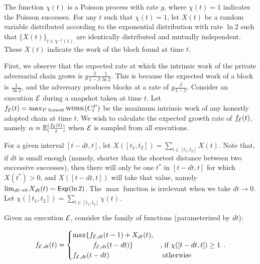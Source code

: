 The function $\chi(t)$ is a Poisson process with rate $g$, where $\chi(t) = 1$
indicates the Poisson successes. For any $t$ such that $\chi(t) = 1$, let $X(t)$ be a
random variable distributed according to the exponential distribution with rate $\ln2$
such that $\{ X(t) \}_{t \in \chi^{-1}(1)}$ are identically distributed and mutually
independent. These $X(t)$ indicate the work of the block found at time $t$.

First, we observe that the expected rate at which the intrinsic work of the private adversarial
chain grows is $g \frac{\beta}{1 - \beta} \frac{1}{\ln2}$. This is because the expected work of a
block is $\frac{1}{\ln2}$, and the adversary produces blocks at a rate of $g \frac{\beta}{1 - \beta}$.
Consider an execution $\mathcal{E}$ during a snapshot taken at time $t$. Let
$f_{\mathcal{E}}(t) = \max_{P \text{ honest}}{\textsc{work}(C^P_t)}$ be the maximum intrinsic work of any honestly
adopted chain at time $t$. We wish to calculate the expected growth rate of $f_{\mathcal{E}}(t)$, namely
$\alpha = \mathop{{}\mathbb{E}}[\frac{f_{\mathcal{E}}(t)}{t}]$ when $\mathcal{E}$ is sampled from all executions.

For a given interval $[t - dt, t]$, let $X([t_1, t_2]) = \sum_{t \in [t_1, t_2]} X(t)$. Note that, if
$dt$ is small enough (namely, shorter than the shortest distance between two successive successes),
then there will only be one $t^*$ in $[t - dt, t]$ for which $X(t^*) > 0$, and $X([t - dt, t])$
will take that value, namely $\lim_{dt \to 0} X_{dt}(t) \sim \textsf{Exp}(\ln2)$.
The $\max$ function is irrelevant when we take $dt \to 0$.
Let $\chi([t_1, t_2]) = \sum_{t \in [t_1, t_2]} \chi(t)$.

Given an execution $\mathcal{E}$, consider the family of functions (parameterized by $dt$):

\[
  f_{\Epsilon,dt}(t) = \begin{cases}
             \max\{f_{\Epsilon,dt}(t - 1) + X_{dt}(t),&\\
    \phantom{\max\{\}}      f_{\Epsilon,dt}(t - dt)\} & \text{, if } \chi([t - dt, t]) \geq 1\\
          f_{\Epsilon,dt}(t - dt) & \text{ otherwise }
  \end{cases}\,.
\]

